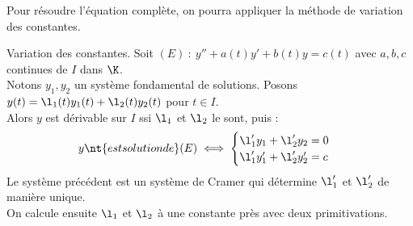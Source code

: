 \documentclass[11pt]{article}
\begin{document}
Pour résoudre l'équation complète, on pourra appliquer la méthode de variation des constantes.

\begin{prop}{Variation des constantes.}{}
    Soit $(E) ~:~ y''+a(t)y'+b(t)y=c(t)$ avec $a,b,c$ continues de $I$ dans $\K$.\\
    Notons $y_1,y_2$ un système fondamental de solutions. Posons $y(t)=\l_1(t)y_1(t)+\l_2(t)y_2(t)$ pour $t\in I$.\\
    Alors $y$ est dérivable sur $I$ ssi $\l_1$ et $\l_2$ le sont, puis :
    \begin{equation*}
        y \nt{ est solution de } (E) \iff \begin{cases}\l_1' y_1 + \l_2' y_2 = 0 \\ \l_1' y_1' + \l_2'y_2' = c\end{cases}
    \end{equation*}
    Le système précédent est un système de Cramer qui détermine $\l_1'$ et $\l_2'$ de manière unique.\\
    On calcule ensuite $\l_1$ et $\l_2$ à une constante près avec deux primitivations.
\end{prop}
\end{document}
